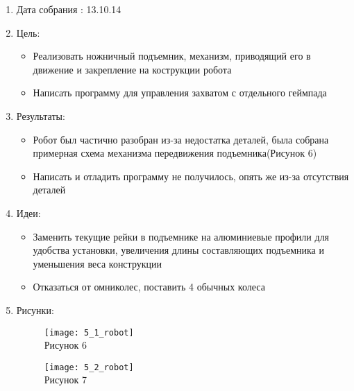 \documentclass[11pt]{article}
\begin{document}
	\begin{enumerate}
		\item Дата собрания : 13.10.14
		\item Цель:
		\begin{itemize}
			\item Реализовать ножничный подъемник, механизм, приводящий его в движение и закрепление на кострукции робота
			\item Написать программу для управления захватом с отдельного геймпада
		\end{itemize}
		\item Результаты:
		\begin{itemize}
			\item Робот был частично разобран из-за недостатка деталей, была собрана примерная схема механизма передвижения подъемника(Рисунок 6)
			\item Написать и отладить программу не получилось, опять же из-за отсутствия деталей
		\end{itemize}
		\item Идеи:
		\begin{itemize}
			\item Заменить текущие рейки в подъемнике на алюминиевые профили для удобства установки, увеличения длины составляющих подъемника и уменьшения веса конструкции
			\item Отказаться от омниколес, поставить 4 обычных колеса
		\end{itemize}
		\item Рисунки:
		\begin{figure} [h]
			\centering
			\begin{minipage}{0.3\linewidth}
				\texttt{[image: 5\_1\_robot]}\\ Рисунок 6
			\end{minipage}
			\begin{minipage}{0.3\linewidth}
				\texttt{[image: 5\_2\_robot]}\\ Рисунок 7
			\end{minipage}
		\end{figure}
	\end{enumerate}
\end{document}
